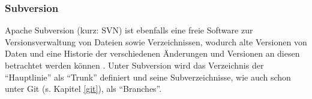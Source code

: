 \subsubsection{Subversion} \label{svn}
Apache Subversion (kurz: SVN) ist ebenfalls eine freie Software zur Versionsverwaltung von Dateien sowie Verzeichnissen, wodurch alte Versionen von Daten und eine Historie der verschiedenen Änderungen und Versionen an diesen betrachtet werden können \cite{Collins-Sussman:2004aa}.
Unter Subversion wird das Verzeichnis der \enquote{Hauptlinie} als \enquote{Trunk} definiert und seine Subverzeichnisse, wie auch schon unter Git (s. Kapitel \ref{git}), als \enquote{Branches}.